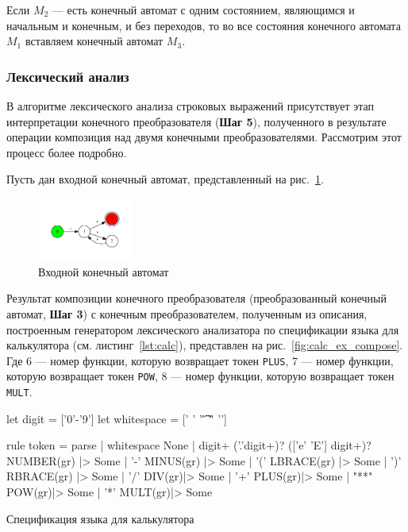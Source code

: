 \documentclass{matmex-diploma}
\begin{document}
Если $M_2$ --- есть конечный автомат с одним состоянием, являющимся и начальным и конечным, и без переходов, то во все состояния конечного автомата $M_1$ вставляем конечный автомат $M_3$. 

\subsubsection{Лексический анализ}

В алгоритме лексического анализа строковых выражений присутствует этап интерпретации конечного преобразователя (\textbf{Шаг 5}), полученного в результате операции композиция над двумя конечными преобразователями. Рассмотрим этот процесс более подробно. 

Пусть дан входной конечный автомат, представленный на рис.~\ref{fig:calc_ex}.

\begin{figure}[H]
\begin{center}
\includegraphics[width=0.28\textwidth]{calc_ex}
\caption{Входной конечный автомат}
\label{fig:calc_ex} 
\end{center}
\end{figure}
Результат композиции конечного преобразователя (преобразованный конечный автомат, \textbf{Шаг 3}) с конечным преобразователем, полученным из описания, построенным генератором лексического анализатора по спецификации языка для калькулятора (см. листинг~\ref{lst:calc}), представлен на рис.~\ref{fig:calc_ex_compose}. Где 6 --- номер функции, которую возвращает токен \verb|PLUS|, 7 --- номер функции, которую возвращает токен \verb|POW|, 8 --- номер функции, которую возвращает токен \verb|MULT|.

\begin{listing}[H]
    \begin{pyglist}[language=csharp,numbers=none]
let digit = ['0'-'9']
let whitespace = [' ' '\t' '\r' '\n']

rule token = parse
| whitespace { None }
| digit+ ('.'digit+)? (['e' 'E'] digit+)? { NUMBER(gr) |> Some }
| '-' { MINUS(gr) |> Some }
| '(' { LBRACE(gr) |> Some }
| ')' { RBRACE(gr) |> Some }
| '/' { DIV(gr)|> Some }
| '+' { PLUS(gr)|> Some }
| "**" { POW(gr)|> Some }
| '*' { MULT(gr)|> Some }
    \end{pyglist}
\caption{Спецификация языка для калькулятора}
\label{lst:calc}
\end{listing}
\end{document}
